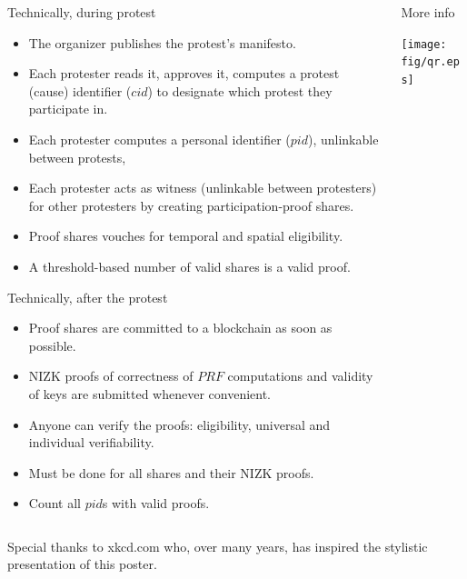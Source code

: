 \begin{columns}[t]
\begin{column}{0.32\linewidth}
    \begin{blackblock}{Technically, during protest}
      \begin{itemize}
        \item The organizer publishes the protest's manifesto.
        \item Each protester reads it, approves it, computes a protest (cause) 
          identifier (\(cid\)) to designate which protest they participate in.
        \item Each protester computes a personal identifier (\(pid\)), 
          unlinkable between protests,
        \item Each protester acts as witness (unlinkable between protesters) for 
          other protesters by creating participation-proof shares.
        \item Proof shares vouches for temporal and spatial eligibility.
        \item A threshold-based number of valid shares is a valid proof.
      \end{itemize}
    \end{blackblock}

    \begin{blackblock}{Technically, after the protest}
      \begin{itemize}
        \item Proof shares are committed to a blockchain as soon as possible.
        \item \Ac{NIZK} proofs of correctness of \(PRF\) computations and 
          validity of keys are submitted whenever convenient.
        \item Anyone can verify the proofs: eligibility, universal and 
          individual verifiability.
        \item Must be done for all shares and their \ac{NIZK} proofs.
        \item Count all \(pid\)s with valid proofs.
      \end{itemize}
    \end{blackblock}

  \end{column}

  \hfill

  \begin{column}{0.32\linewidth}

    \begin{block}{More info}
      \begin{center}
        \texttt{[image: fig/qr.eps]}
      \end{center}
    \end{block}

  \end{column}

\end{columns}

\flushright
Special thanks to xkcd.com who, over many years, has inspired the stylistic 
presentation of this poster.
